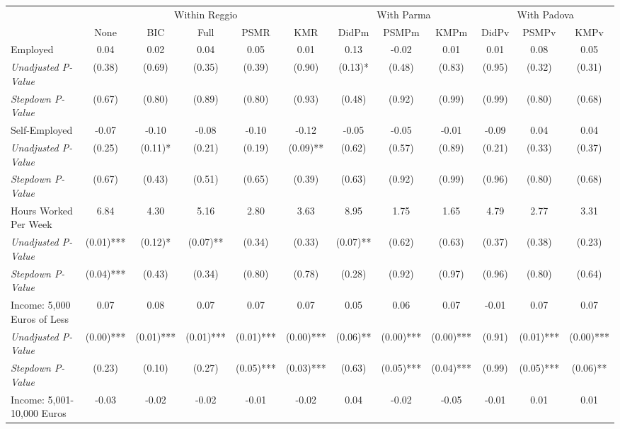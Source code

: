 \begin{tabular}{l c c c c c c c c c c c}
\toprule
& \multicolumn{5}{c}{Within Reggio} & \multicolumn{3}{c}{With Parma} & \multicolumn{3}{c}{With Padova} \\\cmidrule(lr){2-6} \cmidrule(lr){7-9} \cmidrule(lr){10-12}
 & None & BIC & Full & PSMR & KMR & DidPm & PSMPm & KMPm & DidPv & PSMPv & KMPv \\
\midrule
Employed & 0.04 & 0.02 & 0.04 & 0.05 & 0.01 & 0.13 & -0.02 & 0.01 & 0.01 & 0.08 & 0.05 \\
\quad \textit{Unadjusted P-Value} & (0.38) & (0.69) & (0.35) & (0.39) & (0.90) & (0.13)* & (0.48) & (0.83) & (0.95) & (0.32) & (0.31) \\
\quad \textit{Stepdown P-Value} & (0.67) & (0.80) & (0.89) & (0.80) & (0.93) & (0.48) & (0.92) & (0.99) & (0.99) & (0.80) & (0.68) \\
Self-Employed & -0.07 & -0.10 & -0.08 & -0.10 & -0.12 & -0.05 & -0.05 & -0.01 & -0.09 & 0.04 & 0.04 \\
\quad \textit{Unadjusted P-Value} & (0.25) & (0.11)* & (0.21) & (0.19) & (0.09)** & (0.62) & (0.57) & (0.89) & (0.21) & (0.33) & (0.37) \\
\quad \textit{Stepdown P-Value} & (0.67) & (0.43) & (0.51) & (0.65) & (0.39) & (0.63) & (0.92) & (0.99) & (0.96) & (0.80) & (0.68) \\
Hours Worked Per Week & 6.84 & 4.30 & 5.16 & 2.80 & 3.63 & 8.95 & 1.75 & 1.65 & 4.79 & 2.77 & 3.31 \\
\quad \textit{Unadjusted P-Value} & (0.01)*** & (0.12)* & (0.07)** & (0.34) & (0.33) & (0.07)** & (0.62) & (0.63) & (0.37) & (0.38) & (0.23) \\
\quad \textit{Stepdown P-Value} & (0.04)*** & (0.43) & (0.34) & (0.80) & (0.78) & (0.28) & (0.92) & (0.97) & (0.96) & (0.80) & (0.64) \\
Income: 5,000 Euros of Less & 0.07 & 0.08 & 0.07 & 0.07 & 0.07 & 0.05 & 0.06 & 0.07 & -0.01 & 0.07 & 0.07 \\
\quad \textit{Unadjusted P-Value} & (0.00)*** & (0.01)*** & (0.01)*** & (0.01)*** & (0.00)*** & (0.06)** & (0.00)*** & (0.00)*** & (0.91) & (0.01)*** & (0.00)*** \\
\quad \textit{Stepdown P-Value} & (0.23) & (0.10) & (0.27) & (0.05)*** & (0.03)*** & (0.63) & (0.05)*** & (0.04)*** & (0.99) & (0.05)*** & (0.06)** \\
Income: 5,001-10,000 Euros & -0.03 & -0.02 & -0.02 & -0.01 & -0.02 & 0.04 & -0.02 & -0.05 & -0.01 & 0.01 & 0.01 \\

\end{tabular}
